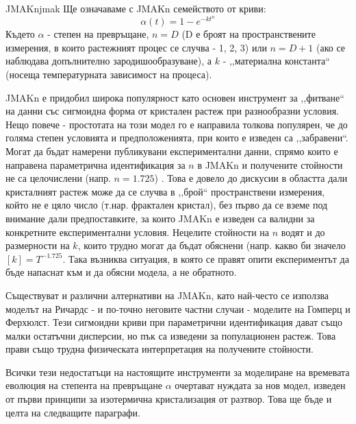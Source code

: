 \begin{result}{JMAKn}{jmak}
    Ще означаваме с JMAKn семейството от криви:
    \begin{equation}
        \label{eq:jmak}
        \alpha(t) = 1 - e^{ - k t^n }
    \end{equation}
    Където $\alpha$ - степен на превръщане, $n = D$ (D е броят на пространствените измерения, в които растежният процес се случва - 1, 2, 3) или $n = D+1$ (ако се наблюдава допълнително зародишообразуване), а $k$ - ,,материална константа`` (носеща температурната зависимост на процеса).
\end{result}


JMAKn е придобил широка популярност като основен инструмент за ,,фитване`` на данни със сигмоидна форма от кристален растеж при разнообразни условия. Нещо повече - простотата на този модел го е направила толкова популярен, че до голяма степен условията и предположенията, при които е изведен са ,,забравени``. Могат да бъдат намерени публикувани експериментални данни, спрямо които е направена параметрична идентификация за $n$ в JMAKn и получените стойности не са целочислени (напр. $n = 1.725$) \cite{Min2005}. Това е довело до дискусии в областта дали кристалният растеж може да се случва в ,,брой`` пространствени измерения, който не е цяло число (т.нар. фрактален кристал), без първо да се вземе под внимание дали предпоставките, за които JMAKn е изведен са валидни за конкретните експериментални условия. Нецелите стойности на $n$ водят и до размерности на $k$, които трудно могат да бъдат обяснени (напр. какво би значело $[k]=T^{-1.725}$. Така възниква ситуация, в която се правят опити експериментът да бъде напаснат към и да обясни модела, а не обратното.

Съществуват и различни алтернативи на JMAKn, като най-често се използва моделът на Ричардс - и по-точно неговите частни случаи - моделите на Гомперц и Ферхюлст. Тези сигмоидни криви при параметрични идентификация дават също малки остатъчни дисперсии, но пък са изведени за популационен растеж. Това прави също трудна физическата интерпретация на получените стойности.

Всички тези недостатъци на настоящите инструменти за моделиране на времевата еволюция на степента на превръщане $\alpha$ очертават нуждата за нов модел, изведен от първи принципи за изотермична кристализация от разтвор. Това ще бъде и целта на следващите параграфи.